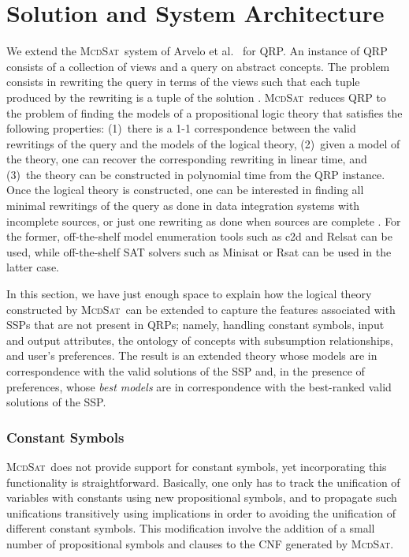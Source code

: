 \documentclass{llncs}
\newcommand{\mcdsat}{\textsc{McdSat}}
\begin{document}
\section{Solution and System Architecture}

We extend the \mcdsat\ system of Arvelo et al.\ \cite{arvelo:aaai06} for QRP.
An instance of QRP consists of a collection of views and a query on abstract
concepts.  The problem consists in rewriting the query in terms of the
views such that each tuple produced by the rewriting is a tuple of the
solution \cite{Ullman00}.
\mcdsat\ reduces QRP to the problem of finding the models of a propositional
logic theory that satisfies the following properties:
(1)~there is a 1-1 correspondence between the valid rewritings of the
query and the models of the logical theory,
(2)~given a model of the theory, one can recover the corresponding rewriting
in linear time, and
(3)~the theory can be constructed in polynomial time from the QRP instance.
Once the logical theory is constructed, one can be interested in finding all
minimal rewritings of the query as done in data integration systems with incomplete
sources, or just one rewriting as done when sources are complete \cite{Ullman00}.
For the former, off-the-shelf model enumeration tools such as c2d \cite{c2d} and
Relsat \cite{relsat} can be used, while off-the-shelf SAT solvers such as
Minisat \cite{minisat} or Rsat \cite{knot07lightweight} can be used in the latter case.

In this section, we have just enough space to explain how the logical
theory constructed by \mcdsat\ can be extended to capture the features
associated with SSPs that are not present in QRPs; namely, handling
constant symbols, input and output attributes, the ontology of concepts
with subsumption relationships, and user's preferences. The result is an
extended theory whose models are in correspondence with the valid solutions
of the SSP and, in the presence of preferences, whose \emph{best models}
are in correspondence with the best-ranked valid solutions of the SSP.

\subsubsection{Constant Symbols}

\mcdsat\ does not provide support for constant symbols, yet incorporating
this functionality is straightforward.
Basically, one only has to track the unification of variables with
constants using new propositional symbols, and to propagate such unifications
transitively using implications in order to avoiding the unification of different
constant symbols.
This modification involve the addition of a small number of propositional
symbols and clauses to the CNF generated by \mcdsat.
\end{document}
